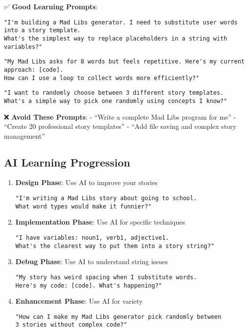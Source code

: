 \documentclass[
  letterpaper,
  DIV=11,
  numbers=noendperiod,
  oneside]{scrreprt}
\begin{document}
✅ \textbf{Good Learning Prompts}:

\begin{verbatim}
"I'm building a Mad Libs generator. I need to substitute user words into a story template. 
What's the simplest way to replace placeholders in a string with variables?"
\end{verbatim}

\begin{verbatim}
"My Mad Libs asks for 8 words but feels repetitive. Here's my current approach: [code].
How can I use a loop to collect words more efficiently?"
\end{verbatim}

\begin{verbatim}
"I want to randomly choose between 3 different story templates. 
What's a simple way to pick one randomly using concepts I know?"
\end{verbatim}

❌ \textbf{Avoid These Prompts}: - ``Write a complete Mad Libs program
for me'' - ``Create 20 professional story templates'' - ``Add file
saving and complex story management''

\subsection{AI Learning Progression}\label{ai-learning-progression-1}

\begin{enumerate}
\def\labelenumi{\arabic{enumi}.}
\item
  \textbf{Design Phase}: Use AI to improve your stories

\begin{verbatim}
"I'm writing a Mad Libs story about going to school. 
What word types would make it funnier?"
\end{verbatim}
\item
  \textbf{Implementation Phase}: Use AI for specific techniques

\begin{verbatim}
"I have variables: noun1, verb1, adjective1. 
What's the clearest way to put them into a story string?"
\end{verbatim}
\item
  \textbf{Debug Phase}: Use AI to understand string issues

\begin{verbatim}
"My story has weird spacing when I substitute words. 
Here's my code: [code]. What's happening?"
\end{verbatim}
\item
  \textbf{Enhancement Phase}: Use AI for variety

\begin{verbatim}
"How can I make my Mad Libs generator pick randomly between 
3 stories without complex code?"
\end{verbatim}
\end{enumerate}
\end{document}
